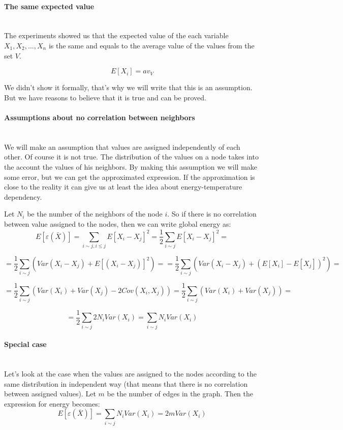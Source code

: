 \documentclass[12pt]{report}
\begin{document}
\paragraph{The same expected value}
\mbox{} \\

The experiments showed us that the expected value of the each variable $X_1, X_2, ..., X_n$ is the same and equals to the average value of the values from the set $V$. 

$$E[X_i] = av_V$$

We didn't show it formally, that's why we will write that this is an assumption. But we have reasons to believe that it is true and can be proved.
\paragraph{Assumptions about no correlation between neighbors}
\mbox{} \\

We will make an assumption that values are assigned independently of each other. Of course it is not true. The distribution of the values on a node takes into the account the values of his neighbors. By making this assumption we will make some error, but we can get the approximated expression. If the approximation is close to the reality it can give us at least the idea about energy-temperature dependency.

 Let $N_i$ be the number of the neighbors of the node $i$. So if there is no correlation between value assigned to the nodes, then we can write global energy as:
$$ E[\varepsilon (\bar{X})] =  \sum_{i \sim j, i \leq j} E[X_i - X_j]^2 = 
\frac{1}{2} \sum_{i \sim j} E[X_i - X_j]^2 = $$

$$ = \frac{1}{2} \sum_{i \sim j} \left(Var(X_i - X_j) + E[(X_i - X_j)]^2 \right)= 
= \frac{1}{2} \sum_{i \sim j} \left(Var(X_i - X_j) + (E[X_i] - E[X_j])^2 \right) = 
$$


$$ = \frac{1}{2} \sum_{i \sim j} \left(Var(X_i) + Var(X_j) - 2Cov(X_i, X_j) \right) = \frac{1}{2} \sum_{i \sim j} \left(Var(X_i) + Var(X_j) \right)=
$$

\begin{equation}
\label{eq:noCorr}
 = \frac{1}{2} \sum_{i \sim j} 2N_iVar(X_i) 
= \sum_{i \sim j} N_iVar(X_i)  
\end{equation}

\paragraph{Special case}
\mbox{} \\
Let's look at the case when the values are assigned to the nodes according to the same distribution in independent way (that means that there is no correlation between assigned values). Let $m$ be the number of edges in the graph. Then the expression for energy becomes:
$$ E[\varepsilon (\bar{X})] =  \sum_{i \sim j} N_iVar(X_i) = 2mVar(X_i)$$
\end{document}
